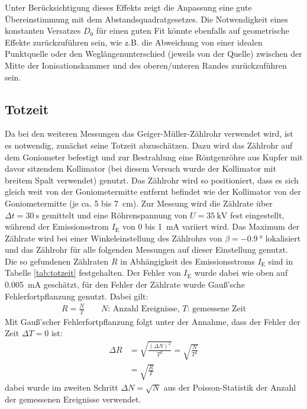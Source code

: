 \documentclass[11pt, a4paper]{article}
\numberwithin{equation}{section}
\begin{document}
Unter Berücksichtigung dieses Effekts zeigt die Anpassung eine gute Übereinstimmung mit dem Abstandsquadratgesetzes.
Die Notwendigkeit eines konstanten Versatzes $D_0$ für einen guten Fit könnte ebenfalls auf geometrische Effekte zurückzuführen sein, wie z.B. die Abweichung von einer idealen Punktquelle oder den Weglängenunterschied (jeweils von der Quelle) zwischen der Mitte der Ionisationskammer und des oberen/unteren Randes zurückzuführen sein.

\subsection{Totzeit}
\label{sec:totzeit}

Da bei den weiteren Messungen das Geiger-Müller-Zählrohr verwendet wird, ist es notwendig, zunächst seine Totzeit abzuschätzen.
Dazu wird das Zählrohr auf dem Goniometer befestigt und zur Bestrahlung eine Röntgenröhre aus Kupfer mit davor sitzendem Kollimator (bei diesem Versuch wurde der Kollimator mit breitem Spalt verwendet) genutzt.
Das Zählrohr wird so positioniert, dass es sich gleich weit von der Goniometermitte entfernt befindet wie der Kollimator von der Goniometermitte (je ca. \num{5} bis \SI{7}{cm}).
Zur Messung wird die Zählrate über $\Delta t=\SI{30}{\second}$ gemittelt und eine Röhrenspannung von $U=\SI{35}{\kilo\volt}$ fest eingestellt, während der Emissionsstrom $I_\text{E}$ von \num{0} bis \SI{1}{\milli\ampere} variiert wird.
Das Maximum der Zählrate wird bei einer Winkeleinstellung des Zählrohrs von $\beta=\SI{-0.9}{\degree}$ lokalisiert und das Zählrohr für alle folgenden Messungen auf dieser Einstellung genutzt.
Die so gefundenen Zählraten $R$ in Abhängigkeit des Emissionsstroms $I_\mathrm{E}$ sind in Tabelle \ref{tab:totzeit} festgehalten.
Der Fehler von $I_\text{E}$ wurde dabei wie oben auf \SI{0.005}{\milli\ampere} geschätzt, für den Fehler der Zählrate wurde Gauß'sche Fehlerfortpflanzung genutzt.
Dabei gilt:
\begin{align}
	R = \frac{N}{T}\qquad\text{$N$: Anzahl Ereignisse, $T$: gemessene Zeit}
\end{align}
Mit Gauß'scher Fehlerfortpflanzung folgt unter der Annahme, dass der Fehler der Zeit $\Delta T=0$ ist:
\begin{align}
	\Delta R &= \sqrt{\frac{(\Delta N)^2}{T^2}} = \sqrt{\frac{N}{T^2}} \nonumber \\
		     &= \sqrt{\frac{R}{T}}
		     \label{eq:zählrate_fehler}
\end{align}
dabei wurde im zweiten Schritt $\Delta N = \sqrt{N}$ aus der Poisson-Statistik der Anzahl der gemessenen Ereignisse verwendet.
\end{document}
